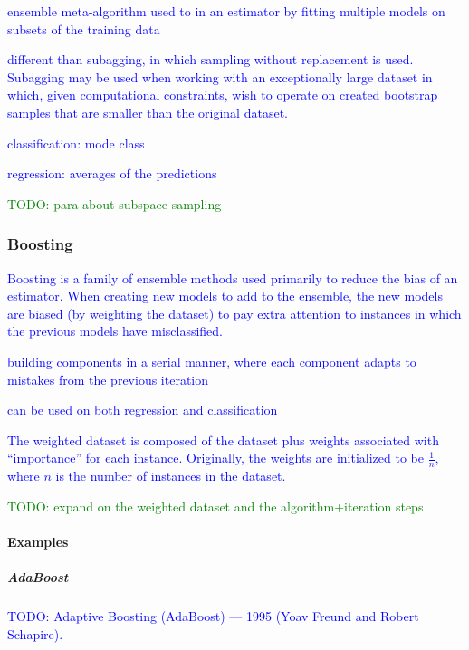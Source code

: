 \textcolor{blue}{ensemble meta-algorithm used to  in an estimator by fitting multiple models on subsets of the training data}

\textcolor{blue}{different than subagging, in which {sampling without replacement} is used. Subagging may be used when working with an exceptionally large dataset in which, given computational constraints, wish to operate on created bootstrap samples that are smaller than the original dataset.}

\textcolor{blue}{classification: mode class}

\textcolor{blue}{regression: averages of the predictions}

\textcolor{green}{TODO: para about {subspace sampling}}

\subsubsection{Boosting}

\textcolor{blue}{Boosting is a family of ensemble methods used primarily to reduce the bias of an estimator. When creating new models to add to the ensemble, the new models are biased (by weighting the dataset) to pay extra attention to instances in which the previous models have misclassified.}

\textcolor{blue}{building components in a serial manner, where each component adapts to mistakes from the previous iteration}

\textcolor{blue}{can be used on both regression and classification}

\textcolor{blue}{The weighted dataset is composed of the dataset plus weights associated with ``importance'' for each instance. Originally, the weights are initialized to be $\frac{1}{n}$, where $n$ is the number of instances in the dataset.}



\textcolor{green}{TODO: expand on the weighted dataset and the algorithm+iteration steps}

\paragraph{Examples}

\subparagraph{AdaBoost}

\textcolor{blue}{TODO: Adaptive Boosting (AdaBoost) --- 1995 (Yoav Freund and Robert Schapire).}

